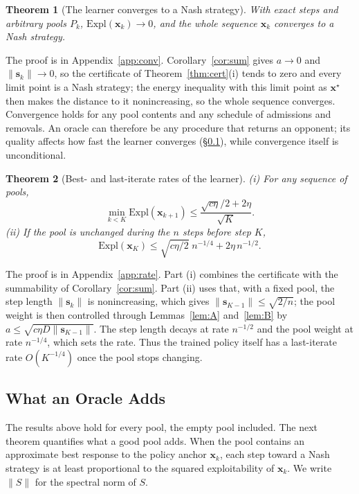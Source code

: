 \documentclass{article}
\theoremstyle{plain}
\newtheorem{theorem}{Theorem}[section]
\theoremstyle{remark}
\newcommand{\Expl}{\mathrm{Expl}}
\newcommand{\bx}{{\bm{x}}}
\newcommand{\xs}{\bx^{\star}}
\newcommand{\dx}{{\bm{s}}}
\begin{document}
\begin{theorem}[The learner converges to a Nash strategy]
\label{thm:conv}
With exact steps and arbitrary pools $P_k$, $\Expl(\bx_k)\to0$, and the whole sequence $\bx_k$ converges to a Nash strategy.
\end{theorem}
The proof is in Appendix~\ref{app:conv}. Corollary~\ref{cor:sum} gives $a\to0$ and $\|\dx_k\|\to0$, so the certificate of Theorem~\ref{thm:cert}(i) tends to zero and every limit point is a Nash strategy; the energy inequality with this limit point as $\xs$ then makes the distance to it nonincreasing, so the whole sequence converges. Convergence holds for any pool contents and any schedule of admissions and removals. An oracle can therefore be any procedure that returns an opponent; its quality affects how fast the learner converges (\S\ref{sec:oracle-rate}), while convergence itself is unconditional.

\begin{theorem}[Best- and last-iterate rates of the learner]
\label{thm:rate}
(i) For any sequence of pools,
\[
\min_{k<K}\Expl(\bx_{k+1})\le\frac{\sqrt{c\eta}/2+2\eta}{\sqrt K} .
\]
(ii) If the pool is unchanged during the $n$ steps before step $K$,
\[
\Expl(\bx_K)\le\sqrt{c\eta/2}\;n^{-1/4}+2\eta\,n^{-1/2} .
\]
\end{theorem}
The proof is in Appendix~\ref{app:rate}. Part (i) combines the certificate with the summability of Corollary~\ref{cor:sum}. Part (ii) uses that, with a fixed pool, the step length $\|\dx_k\|$ is nonincreasing, which gives $\|\dx_{K-1}\|\le\sqrt{2/n}$; the pool weight is then controlled through Lemmas~\ref{lem:A} and~\ref{lem:B} by $a\le\sqrt{c\eta D\|\dx_{K-1}\|}$. The step length decays at rate $n^{-1/2}$ and the pool weight at rate $n^{-1/4}$, which sets the rate. Thus the trained policy itself has a last-iterate rate $O(K^{-1/4})$ once the pool stops changing.

\subsection{What an Oracle Adds}
\label{sec:oracle-rate}

The results above hold for every pool, the empty pool included. The next theorem quantifies what a good pool adds. When the pool contains an approximate best response to the policy anchor $\bx_k$, each step toward a Nash strategy is at least proportional to the squared exploitability of $\bx_k$. We write $\|S\|$ for the spectral norm of $S$.
\end{document}
